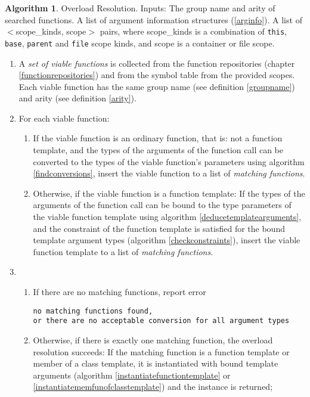 \documentclass[a4paper,oneside,11pt]{book}
\theoremstyle{definition}
\newtheorem{algo}{Algorithm}[section]
\begin{document}
\begin{algo} Overload Resolution\label{resolveoverload}. Inputs: The group name and arity of searched functions.
A list of argument information structures (\ref{arginfo}). A list of $<$scope\_kinds, scope$>$ pairs,
where scope\_kinds is a combination of \verb|this|, \verb|base|, \verb|parent| and \verb|file| scope kinds, and scope is a container or file scope.
\begin{enumerate}
\item
A \emph{set of viable functions} is collected from the function repositories (chapter \ref{functionrepositories}) and from the symbol table from the
provided scopes. Each viable function has the same group name (see definition \ref{groupname}) and arity (see definition \ref{arity}).
\item
For each viable function:
\begin{enumerate}
\item
If the viable function is an ordinary function, that is: not a function template,
and the types of the arguments of the function call can be converted to the types of the viable function's parameters using algorithm \ref{findconversions},
insert the viable function to a list of \emph{matching functions}.
\item
Otherwise, if the viable function is a function template:
If the types of the arguments of the function call can be bound to the type parameters of the viable function template using
algorithm \ref{deducetemplatearguments}, and
the constraint of the function template is satisfied for the bound template argument types (algorithm \ref{checkconstraints}),
insert the viable function template to a list of \emph{matching functions}.
\end{enumerate}
\item
\begin{enumerate}
\item
If there are no matching functions, report error\\
\begin{verbatim}
no matching functions found,
or there are no acceptable conversion for all argument types
\end{verbatim}
\item
Otherwise, if there is exactly one matching function, the overload resolution succeeds:
If the matching function is a function template or member of a class template, it is instantiated with bound template arguments
(algorithm \ref{instantiatefunctiontemplate} or \ref{instantiatememfunofclasstemplate})
and the instance is returned;

\end{enumerate}
\end{enumerate}
\end{algo}
\end{document}
